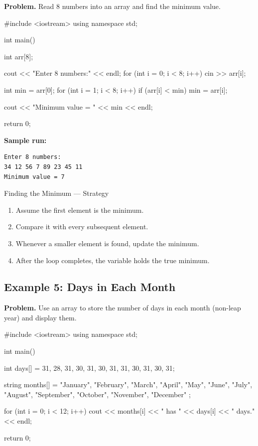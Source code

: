 \textbf{Problem.} Read 8 numbers into an array and find the minimum
value.

\begin{cppcode}
#include <iostream>
using namespace std;

int main() {
    int arr[8];

    cout << "Enter 8 numbers:" << endl;
    for (int i = 0; i < 8; i++) {
        cin >> arr[i];
    }

    int min = arr[0];
    for (int i = 1; i < 8; i++) {
        if (arr[i] < min) {
            min = arr[i];
        }
    }

    cout << "Minimum value = " << min << endl;

    return 0;
}
\end{cppcode}

\textbf{Sample run:}
\begin{verbatim}
Enter 8 numbers:
34 12 56 7 89 23 45 11
Minimum value = 7
\end{verbatim}

\begin{infobox}{Finding the Minimum --- Strategy}
\begin{enumerate}
    \item Assume the first element is the minimum.
    \item Compare it with every subsequent element.
    \item Whenever a smaller element is found, update the minimum.
    \item After the loop completes, the variable holds the true
          minimum.
\end{enumerate}
\end{infobox}

\subsection{Example 5: Days in Each Month}

\textbf{Problem.} Use an array to store the number of days in each
month (non-leap year) and display them.

\begin{cppcode}
#include <iostream>
using namespace std;

int main() {
    int days[] = {31, 28, 31, 30, 31, 30,
                  31, 31, 30, 31, 30, 31};

    string months[] = {
        "January",   "February", "March",
        "April",     "May",      "June",
        "July",      "August",   "September",
        "October",   "November", "December"
    };

    for (int i = 0; i < 12; i++) {
        cout << months[i] << " has "
             << days[i] << " days." << endl;
    }

    return 0;
}
\end{cppcode}

